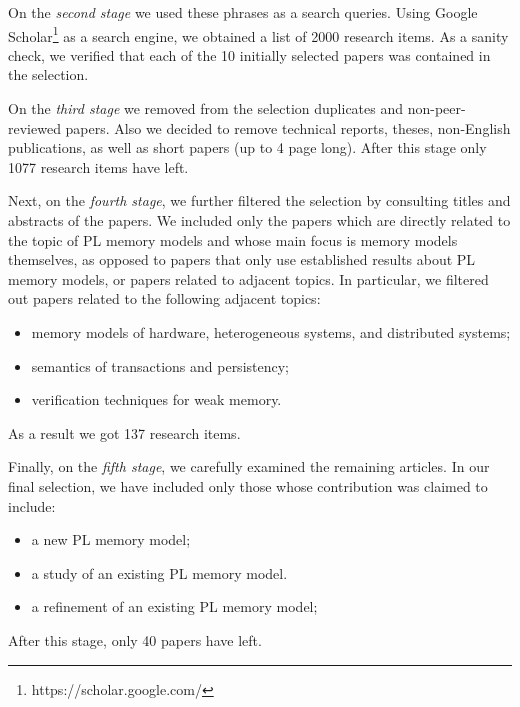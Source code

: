 On the \emph{second stage} we used these phrases as a search queries. 
Using Google Scholar\footnote{https://scholar.google.com/} as a search engine, 
we obtained a list of 2000 research items. 
As a sanity check, we verified that each of the 10 initially selected papers 
was contained in the selection. 

On the \emph{third stage} we removed from the selection duplicates and non-peer-reviewed papers. 
Also we decided to remove technical reports, theses, 
non-English publications, as well as short papers (up to 4 page long).
After this stage only 1077 research items have left.

Next, on the \emph{fourth stage}, we further filtered the selection 
by consulting titles and abstracts of the papers. 
We included only the papers which are directly related to the 
topic of PL memory models and whose main focus is memory models themselves,
as opposed to papers that only use established results about PL memory models,
or papers related to adjacent topics. 
In particular, we filtered out papers related to the following adjacent topics:
\begin{itemize}
  \item memory models of hardware, heterogeneous systems, and distributed systems;
  \item semantics of transactions and persistency;
  \item verification techniques for weak memory.
\end{itemize}
As a result we got 137 research items.

Finally, on the \emph{fifth stage}, we carefully examined the remaining articles.
In our final selection, we have included only those whose contribution was claimed to include:
\begin{itemize}
  \item a new PL memory model;
  \item a study of an existing PL memory model.
  \item a refinement of an existing PL memory model;
\end{itemize}
After this stage, only 40 papers have left.


